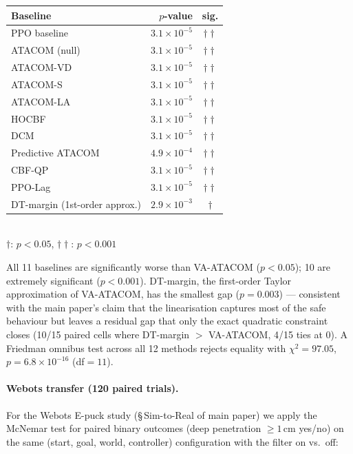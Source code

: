 \documentclass[letterpaper]{article}
\begin{document}
\begin{table}[h]
\centering
\setlength{\tabcolsep}{4pt}
\begin{tabular}{lrc}
\toprule
Baseline & $p$-value & sig.\\
\midrule
PPO baseline       & $3.1\!\times\!10^{-5}$ & $\dag\dag$\\
ATACOM (null)      & $3.1\!\times\!10^{-5}$ & $\dag\dag$\\
ATACOM-VD          & $3.1\!\times\!10^{-5}$ & $\dag\dag$\\
ATACOM-S           & $3.1\!\times\!10^{-5}$ & $\dag\dag$\\
ATACOM-LA          & $3.1\!\times\!10^{-5}$ & $\dag\dag$\\
HOCBF              & $3.1\!\times\!10^{-5}$ & $\dag\dag$\\
DCM                & $3.1\!\times\!10^{-5}$ & $\dag\dag$\\
Predictive ATACOM  & $4.9\!\times\!10^{-4}$ & $\dag\dag$\\
CBF-QP             & $3.1\!\times\!10^{-5}$ & $\dag\dag$\\
PPO-Lag            & $3.1\!\times\!10^{-5}$ & $\dag\dag$\\
DT-margin (1st-order approx.) & $2.9\!\times\!10^{-3}$ & $\dag$\\
\bottomrule
\end{tabular}
\\[2pt]
\small{$\dag$: $p<0.05$, $\dag\dag$: $p<0.001$}
\end{table}

All 11 baselines are significantly worse than VA-ATACOM ($p<0.05$); 10 are extremely significant ($p<0.001$). DT-margin, the first-order Taylor approximation of VA-ATACOM, has the smallest gap ($p{=}0.003$) --- consistent with the main paper's claim that the linearisation captures most of the safe behaviour but leaves a residual gap that only the exact quadratic constraint closes (10/15 paired cells where DT-margin $>$ VA-ATACOM, 4/15 ties at 0). A Friedman omnibus test across all 12 methods rejects equality with $\chi^2{=}97.05$, $p{=}6.8\!\times\!10^{-16}$ (df${=}11$).

\paragraph{Webots transfer (120 paired trials).}
For the Webots E-puck study (§\,Sim-to-Real of main paper) we apply the McNemar test for paired binary outcomes (deep penetration $\ge 1$\,cm yes/no) on the same (start, goal, world, controller) configuration with the filter on vs.\ off:
\end{document}

